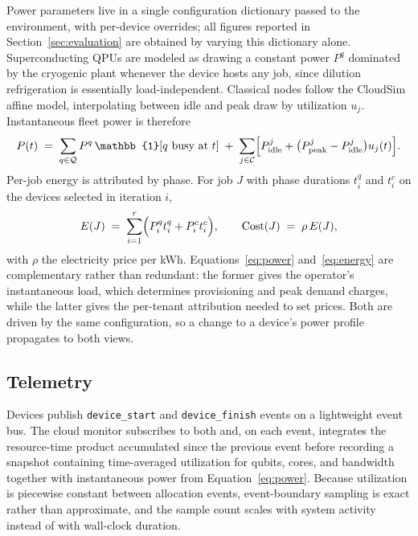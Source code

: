 Power parameters live in a single configuration dictionary passed to the
environment, with per-device overrides; all figures reported in
Section~\ref{sec:evaluation} are obtained by varying this dictionary alone.
Superconducting QPUs are modeled as drawing a constant power $P^{q}$ dominated
by the cryogenic plant whenever the device hosts any job, since dilution
refrigeration is essentially load-independent. Classical nodes follow the
CloudSim affine model, interpolating between idle and peak draw by utilization
$u_j$. Instantaneous fleet power is therefore
\begin{equation}
\label{eq:power}
P(t) \;=\; \sum_{q \in \mathcal{Q}} P^{q}\,\mathbb{1}\!\left[\text{$q$ busy at $t$}\right]
\;+\; \sum_{j \in \mathcal{C}} \Bigl[P^{j}_{\mathrm{idle}} + \bigl(P^{j}_{\mathrm{peak}} - P^{j}_{\mathrm{idle}}\bigr) u_j(t)\Bigr].
\end{equation}
Per-job energy is attributed by phase. For job $J$ with phase durations
$t^{q}_{i}$ and $t^{c}_{i}$ on the devices selected in iteration $i$,
\begin{equation}
\label{eq:energy}
E(J) \;=\; \sum_{i=1}^{r}\Bigl(P^{q}_{i} t^{q}_{i} + P^{c}_{i} t^{c}_{i}\Bigr),
\qquad
\mathrm{Cost}(J) \;=\; \rho\, E(J),
\end{equation}
with $\rho$ the electricity price per kWh. Equations~\eqref{eq:power}
and~\eqref{eq:energy} are complementary rather than redundant: the former gives
the operator's instantaneous load, which determines provisioning and peak
demand charges, while the latter gives the per-tenant attribution needed to set
prices. Both are driven by the same configuration, so a change to a device's
power profile propagates to both views.

\subsection{Telemetry}
\label{sec:arch-telemetry}

Devices publish \texttt{device\_start} and \texttt{device\_finish} events on a
lightweight event bus. The cloud monitor subscribes to both and, on each event,
integrates the resource-time product accumulated since the previous event
before recording a snapshot containing time-averaged utilization for qubits,
cores, and bandwidth together with instantaneous power from
Equation~\eqref{eq:power}. Because utilization is piecewise constant between
allocation events, event-boundary sampling is exact rather than approximate,
and the sample count scales with system activity instead of with wall-clock
duration.

